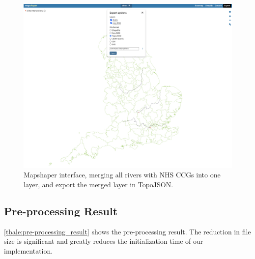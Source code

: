 {
    \begin{figure}[tbh!]
        \centering
        \includegraphics[width=\columnwidth]{figure/qgis/export_topojson.png}
        \caption{Mapshaper interface, merging all rivers with NHS CCGs into one layer, and export the merged layer in TopoJSON.}
        \label{fig:export_topojson}
    \end{figure}
}

\subsection{Pre-processing Result}

\autoref{tbale:pre-processing_result} shows the pre-processing result. The reduction in file size is significant and greatly reduces the initialization time of our implementation.

{
\renewcommand{\arraystretch}{1.5}
\begin{table}[!tb]
	\centering
	\caption{The file size is reduced by 88.5\% from the original size.}
	\label{table:pre-processing_result}
\end{table}
}

